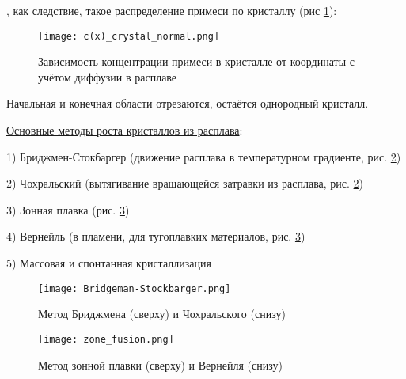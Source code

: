 , как следствие, такое распределение примеси по кристаллу (рис \ref{fig:c(x)_crystal_normal}):
\begin{figure}[h!]
\centering
\texttt{[image: c(x)\_crystal\_normal.png]}\caption{Зависимость концентрации примеси в кристалле от координаты с учётом диффузии в расплаве}\label{fig:c(x)_crystal_normal}
\end{figure}
\par Начальная и конечная области отрезаются, остаётся однородный кристалл.
\par \underline{Основные методы роста кристаллов из расплава}:
\par 1) Бриджмен-Стокбаргер (движение расплава в температурном градиенте, рис. \ref{fig:Bridgeman_Stockbarger})
\par 2) Чохральский (вытягивание вращающейся затравки из расплава, рис. \ref{fig:Bridgeman_Stockbarger})
\par 3) Зонная плавка (рис. \ref{fig:zone_fusion})
\par 4) Вернейль (в пламени, для тугоплавких материалов, рис. \ref{fig:zone_fusion})
\par 5) Массовая и спонтанная кристаллизация 
\begin{figure}[h!]
\centering
\texttt{[image: Bridgeman-Stockbarger.png]}\caption{Метод Бриджмена (сверху) и Чохральского (снизу)}\label{fig:Bridgeman_Stockbarger}
\end{figure}
\begin{figure}[h!]
\centering
\texttt{[image: zone\_fusion.png]}\caption{Метод зонной плавки (сверху) и Вернейля (снизу)}\label{fig:zone_fusion}
\end{figure}
